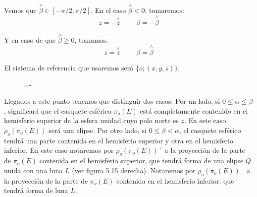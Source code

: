 Vemos que $\overset{\wedge}{\beta}\in[-\pi/2,\pi/2]$. En el caso $\overset{\wedge}{\beta}<0$, tomaremos:
$$z = -\overset{\wedge}{z}\hspace{1cm} \beta = -\overset{\wedge}{\beta}$$

Y en caso de que $\overset{\wedge}{\beta}\geq 0$, tomamos:
$$z = \overset{\wedge}{z}\hspace{1cm} \beta = \overset{\wedge}{\beta}$$

El sistema de referencia que usaremos será $\{o;(x,y,z)\}$.

\begin{figure}[h]
  \lineskip=-\fboxrule
\end{figure}

Llegados a este punto tenemos que distinguir dos casos. Por un lado, si $0\leq\alpha\leq\beta$, significará que el casquete esférico $\pi_o(E)$ está completamente contenido en el hemisferio superior de la esfera unidad cuyo polo norte es $z$. En este caso, $\rho_o(\pi_o(E))$ será una elipse. Por otro lado, si $0\leq\beta<\alpha$, el casquete esférico tendrá una parte contenida en el hemisferio superior y otra en el hemisferio inferior. En este caso notaremos por $\rho_o(\pi_o(E))^+$ a la proyección de la parte de $\pi_o(E)$ contenida en el hemisferio superior, que tendrá forma de una elipse $Q$ unida con una luna $L$ (ver figura 5.15 derecha). Notaremos por $\rho_o(\pi_o(E))^-$ a la proyección de la parte de $\pi_o(E)$ contenida en el hemisferio inferior, que tendrá forma de luna $L$.

